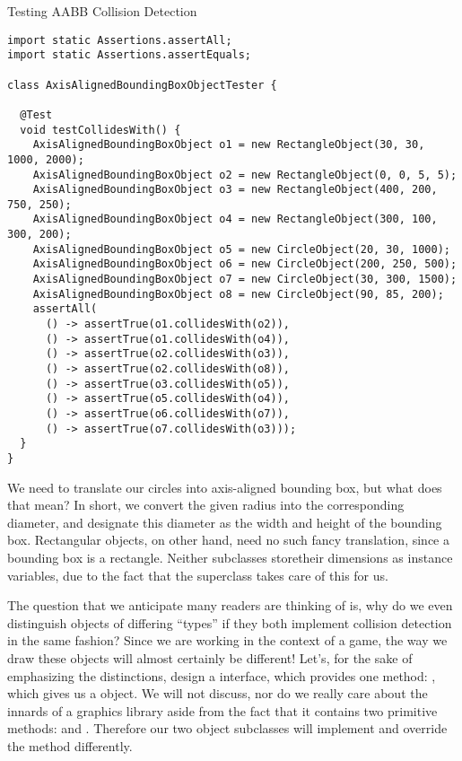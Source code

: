 \begin{cl}[]{Testing AABB Collision Detection}
\begin{lstlisting}[language=MyJava]
import static Assertions.assertAll;
import static Assertions.assertEquals;

class AxisAlignedBoundingBoxObjectTester {

  @Test
  void testCollidesWith() {
    AxisAlignedBoundingBoxObject o1 = new RectangleObject(30, 30, 1000, 2000);
    AxisAlignedBoundingBoxObject o2 = new RectangleObject(0, 0, 5, 5);
    AxisAlignedBoundingBoxObject o3 = new RectangleObject(400, 200, 750, 250);
    AxisAlignedBoundingBoxObject o4 = new RectangleObject(300, 100, 300, 200);
    AxisAlignedBoundingBoxObject o5 = new CircleObject(20, 30, 1000);
    AxisAlignedBoundingBoxObject o6 = new CircleObject(200, 250, 500);
    AxisAlignedBoundingBoxObject o7 = new CircleObject(30, 300, 1500);
    AxisAlignedBoundingBoxObject o8 = new CircleObject(90, 85, 200);
    assertAll(
      () -> assertTrue(o1.collidesWith(o2)),
      () -> assertTrue(o1.collidesWith(o4)),
      () -> assertTrue(o2.collidesWith(o3)),
      () -> assertTrue(o2.collidesWith(o8)),
      () -> assertTrue(o3.collidesWith(o5)),
      () -> assertTrue(o5.collidesWith(o4)),
      () -> assertTrue(o6.collidesWith(o7)),
      () -> assertTrue(o7.collidesWith(o3)));
  }
}
\end{lstlisting}
\end{cl}

We need to translate our circles into axis-aligned bounding box, but what does that mean? In short, we convert the given radius into the corresponding diameter, and designate this diameter as the width and height of the bounding box. Rectangular objects, on other hand, need no such fancy translation, since a bounding box is a rectangle. Neither subclasses storetheir dimensions as instance variables, due to the fact that the superclass takes care of this for us.

The question that we anticipate many readers are thinking of is, why do we even distinguish objects of differing ``types'' if they both implement collision detection in the same fashion? Since we are working in the context of a game, the way we draw these objects will almost certainly be different! Let's, for the sake of emphasizing the distinctions, design a  interface, which provides one method: , which gives us a  object. We will not discuss, nor do we really care about the innards of a graphics library aside from the fact that it contains two primitive methods:  and . Therefore our two object subclasses will implement  and override the method differently.

